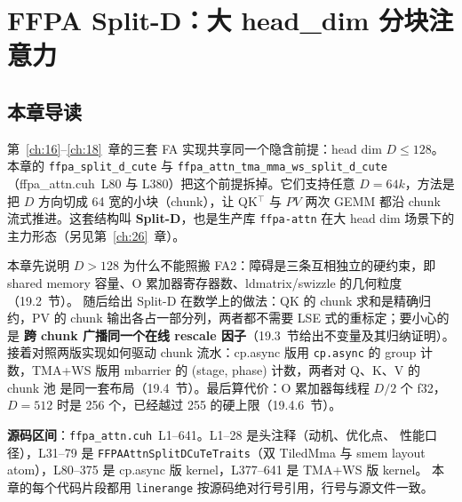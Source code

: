 \chapter{FFPA Split-D：大 head\_dim 分块注意力}\label{ch:19}

\section{本章导读}

第~\ref{ch:16}--\ref{ch:18}~章的三套 FA 实现共享同一个隐含前提：head dim $D \le 128$。
本章的 \texttt{ffpa\_\allowbreak{}split\_\allowbreak{}d\_\allowbreak{}cute} 与
\texttt{ffpa\_attn\_}\allowbreak\texttt{tma\_}\allowbreak\texttt{mma\_ws\_}\allowbreak\texttt{split\_\allowbreak{}d\_\allowbreak{}cute}
（ffpa\_attn.cuh~L80 与 L380）把这个前提拆掉。它们支持任意 $D = 64k$，方法是
把 $D$ 方向切成 64 宽的小块（chunk），让 QK${}^\top$ 与 $PV$ 两次 GEMM 都沿
chunk 流式推进。这套结构叫 \textbf{Split-D}，也是生产库
\texttt{ffpa-attn} 在大 head dim 场景下的主力形态（另见第~\ref{ch:26}~章）。

本章先说明 $D > 128$ 为什么不能照搬 FA2：障碍是三条互相独立的硬约束，即
shared memory 容量、O 累加器寄存器数、ldmatrix/swizzle 的几何粒度（19.2~节）。
随后给出 Split-D 在数学上的做法：QK 的 chunk 求和是精确归约，PV 的
chunk 输出各占一部分列，两者都不需要 LSE 式的重标定；要小心的是
\textbf{跨 chunk 广播同一个在线 rescale 因子}（19.3~节给出不变量及其归纳证明）。
接着对照两版实现如何驱动 chunk 流水：cp.async 版用 \texttt{cp.async} 的 group
计数，TMA+WS 版用 mbarrier 的 (stage, phase) 计数，两者对 Q、K、V 的 chunk 池
是同一套布局（19.4~节）。最后算代价：O 累加器每线程 $D/2$ 个 f32，$D = 512$
时是 256 个，已经越过 255 的硬上限（19.4.6~节）。

\textbf{源码区间}：\texttt{ffpa\_\allowbreak{}attn.\allowbreak{}cuh}~L1--641。L1--28 是头注释（动机、优化点、
性能口径），L31--79 是 \texttt{FFPAAttn}\allowbreak\texttt{SplitDCuTe}\allowbreak\texttt{Traits}（双 TiledMma 与 smem
layout atom），L80--375 是 cp.async 版 kernel，L377--641 是 TMA+WS 版 kernel。
本章的每个代码片段都用 \texttt{linerange} 按源码绝对行号引用，行号与源文件一致。

